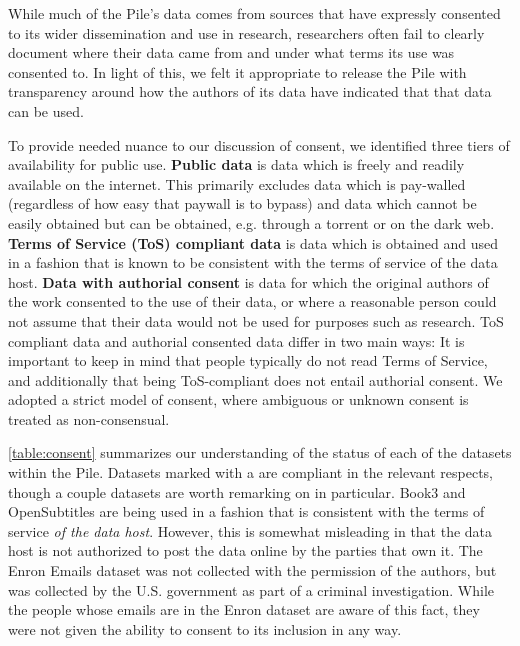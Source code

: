 While much of the Pile's data comes from sources that have expressly consented to its wider dissemination and use in research, researchers often fail to clearly document where their data came from and under what terms its use was consented to. In light of this, we felt it appropriate to release the Pile with transparency around how the authors of its data have indicated that that data can be used.

To provide needed nuance to our discussion of consent, we identified three tiers of availability for public use. \textbf{Public data} is data which is freely and readily available on the internet. This primarily excludes data which is pay-walled (regardless of how easy that paywall is to bypass) and data which cannot be easily obtained but can be obtained, e.g. through a torrent or on the dark web. \textbf{Terms of Service (ToS) compliant data} is data which is obtained and used in a fashion that is known to be consistent with the terms of service of the data host. \textbf{Data with authorial consent} is data for which the original authors of the work consented to the use of their data, or where a reasonable person could not assume that their data would not be used for purposes such as research. ToS compliant data and authorial consented data differ in two main ways: It is important to keep in mind that people typically do not read Terms of Service, and additionally that being ToS-compliant does not entail authorial consent. We adopted a strict model of consent, where ambiguous or unknown consent is treated as non-consensual.

\ref{table:consent} summarizes our understanding of the status of each of the datasets within the Pile. Datasets marked with a  are compliant in the relevant respects, though a couple datasets are worth remarking on in particular. Book3 and OpenSubtitles are being used in a fashion that is consistent with the terms of service \textit{of the data host}. However, this is somewhat misleading in that the data host is not authorized to post the data online by the parties that own it. The Enron Emails dataset was not collected with the permission of the authors, but was collected by the U.S. government as part of a criminal investigation. While the people whose emails are in the Enron dataset are aware of this fact, they were not given the ability to consent to its inclusion in any way.

